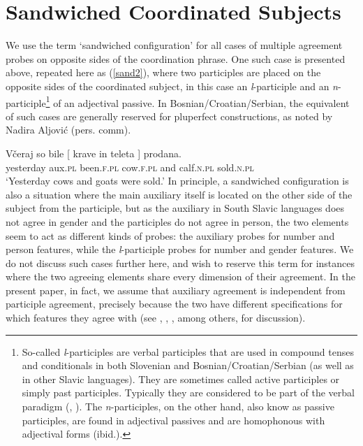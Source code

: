 \documentclass[output=paper
,modfonts
,nonflat]{langsci/langscibook}
\begin{document}
\section{Sandwiched Coordinated Subjects}\label{sec:sandwconf}

We use the term `sandwiched configuration' for all cases of multiple agreement probes on opposite sides of the coordination phrase. One such case is presented above, repeated here as (\ref{sand2}), where two participles are placed on the opposite sides of the coordinated subject, in this case an \textit{l}-participle and an \textit{n}-participle\footnote{So-called \textit{l}-participles are verbal participles that are used in compound tenses and conditionals in both Slovenian and Bosnian/Croatian/Serbian (as well as in other Slavic languages). They are sometimes called active participles or simply past participles. Typically they are considered to be part of the verbal paradigm (\citealt{browne:93}, \citealt{priestly:93}). The \textit{n}-participles, on the other hand, also know as passive participles, are found in adjectival passives and are homophonous with adjectival forms (ibid.).} of an adjectival passive. In Bosnian/Croatian/Serbian, the equivalent of such cases are generally reserved for pluperfect constructions, as noted by Nadira Aljović (pers. comm).

\ea \label{sand2}
\gll Včeraj      so    bile       [ krave    in    teleta ]    prodana.\\
yesterday aux.\textsc{pl} been.\textsc{f.pl} {} cow.\textsc{f.pl} and calf.\textsc{n.pl} {}   sold.\textsc{n.pl} \\
\glt `Yesterday cows and goats were sold.'
\z
In principle, a sandwiched configuration is also a situation where the main auxiliary itself is located on the other side of the subject from the participle, but as the auxiliary in South Slavic languages does not agree in gender and the participles do not agree in person, the two elements seem to act as different kinds of probes: the auxiliary probes for number and person features, while the \textit{l}-participle probes for number and gender features. We do not discuss such cases  further here, and wish to reserve this term for instances where the two agreeing elements share every dimension of their agreement. In the present paper, in fact, we assume that auxiliary agreement is independent from participle agreement, precisely because the two have different specifications for which features they agree with (see \citealt{dalessandro:07}, \citealt{lopez:07}, \citealt{puskar:17}, among others, for discussion).
\end{document}
